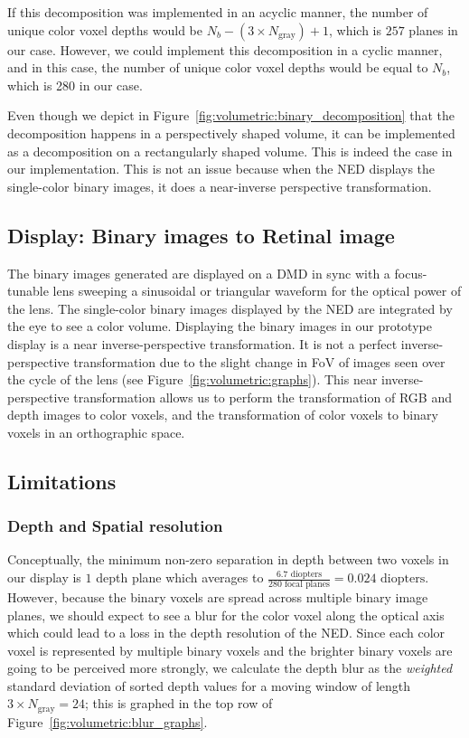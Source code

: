 If this decomposition was implemented in an acyclic manner, the number of unique color voxel depths would be $N_b - (3 \times N_{\text{gray}}) + 1$, which is $257$ planes in our case. However, we could implement this decomposition in a cyclic manner, and in this case, the number of unique color voxel depths would be equal to $N_b$, which is 280 in our case. 

Even though we depict in Figure~\ref{fig:volumetric:binary_decomposition} that the decomposition happens in a perspectively shaped volume, it can be implemented as a decomposition on a rectangularly shaped volume. This is indeed the case in our implementation. This is not an issue because when the NED displays the single-color binary images, it does a near-inverse perspective transformation. 

\subsection{Display: Binary images to Retinal image}
The binary images generated are displayed on a DMD in sync with a focus-tunable lens sweeping a sinusoidal or triangular waveform for the optical power of the lens. The single-color binary images displayed by the NED are integrated by the eye to see a color volume. Displaying the binary images in our prototype display is a near inverse-perspective transformation. It is not a perfect inverse-perspective transformation due to the slight change in FoV of images seen over the cycle of the lens (see Figure~\ref{fig:volumetric:graphs}). This near inverse-perspective transformation allows us to perform the transformation of RGB and depth images to color voxels, and the transformation of color voxels to binary voxels in an orthographic space. 

\subsection{Limitations}
\subsubsection{Depth and Spatial resolution}
Conceptually, the minimum non-zero separation in depth between two voxels in our display is $1$ depth plane which averages to $\frac{\text{6.7 diopters}}{\text{280 focal planes}}=\text{0.024 diopters}$. However, because the binary voxels are spread across multiple binary image planes, we should expect to see a blur for the color voxel along the optical axis which could lead to a loss in the depth resolution of the NED. Since each color voxel is represented by multiple binary voxels and the brighter binary voxels are going to be perceived more strongly, we calculate the depth blur as the \emph{weighted} standard deviation of sorted depth values for a moving window of length $3 \times N_{\text{gray}}=24$; this is graphed in the top row of Figure~\ref{fig:volumetric:blur_graphs}. 

